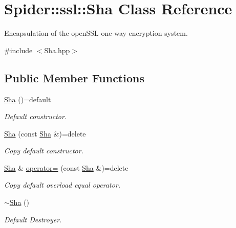 \hypertarget{class_spider_1_1ssl_1_1_sha}{}\section{Spider\+:\+:ssl\+:\+:Sha Class Reference}
\label{class_spider_1_1ssl_1_1_sha}


Encapsulation of the open\+S\+SL one-\/way encryption system.  




{\ttfamily \#include $<$Sha.\+hpp$>$}

\subsection*{Public Member Functions}
\begin{DoxyCompactItemize}
\item 
\mbox{\label{class_spider_1_1ssl_1_1_sha_a12298a5b315c37089c684a22daced627}} 
\hyperlink{class_spider_1_1ssl_1_1_sha_a12298a5b315c37089c684a22daced627}{Sha} ()=default
\begin{DoxyCompactList}\small\item\em Default constructor. \end{DoxyCompactList}\item 
\mbox{\label{class_spider_1_1ssl_1_1_sha_ac5d86154f021e3148eadf4e3ef310ef7}} 
\hyperlink{class_spider_1_1ssl_1_1_sha_ac5d86154f021e3148eadf4e3ef310ef7}{Sha} (const \hyperlink{class_spider_1_1ssl_1_1_sha}{Sha} \&)=delete
\begin{DoxyCompactList}\small\item\em Copy default constructor. \end{DoxyCompactList}\item 
\hyperlink{class_spider_1_1ssl_1_1_sha}{Sha} \& \hyperlink{class_spider_1_1ssl_1_1_sha_a92e690d4b4c94f11d5be4f1d42bc2898}{operator=} (const \hyperlink{class_spider_1_1ssl_1_1_sha}{Sha} \&)=delete
\begin{DoxyCompactList}\small\item\em Copy default overload equal operator. \end{DoxyCompactList}\item 
\mbox{\label{class_spider_1_1ssl_1_1_sha_a52c2a3dd7416b21dfa5651b56fec6b53}} 
\hyperlink{class_spider_1_1ssl_1_1_sha_a52c2a3dd7416b21dfa5651b56fec6b53}{$\sim$\+Sha} ()
\begin{DoxyCompactList}\small\item\em Default Destroyer. \end{DoxyCompactList}\end{DoxyCompactItemize}
